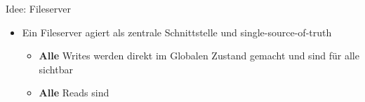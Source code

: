 \begin{frame}
    \slidehead
    Idee: Fileserver
    \begin{itemize}
        \item Ein Fileserver agiert als zentrale Schnittstelle und single-source-of-truth
        \begin{itemize}
            \item \textbf{Alle} Writes werden direkt im Globalen Zustand gemacht und sind für alle sichtbar
            \item \textbf{Alle} Reads sind
        \end{itemize}
    \end{itemize}
\end{frame}
